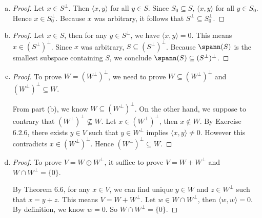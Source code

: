 \begin{Exercise}
	\begin{enumerate}[(a)]
		\item
		\begin{proof}
			Let $x\in S^{\perp}$. Then $\langle x,y \rangle$ for all $y\in S$. Since $S_0 \subseteq S$, $\langle x,y \rangle$ for all $y\in S_0$. Hence $x\in S_0^{\perp}$. Because $x$ was arbitrary, it follows that $S^{\perp}\subseteq S_0^{\perp}$.
		\end{proof}
		
		\item
		\begin{proof}
			Let $x\in S$, then for any $y\in S^{\perp}$, we have $\langle x,y \rangle = 0$. This means $x\in (S^{\perp})^{\perp}$. Since $x$ was arbitrary, $S\subseteq (S^{\perp})^{\perp}$. Because $\spann(S)$ is the smallest subspace containing $S$, we conclude $\spann(S)\subseteq (S^{\perp})^{\perp}$.
		\end{proof}
		
		\item
		\begin{proof}
			To prove $W = (W^{\perp})^{\perp}$, we need to prove $W \subseteq (W^{\perp})^{\perp}$ and $(W^{\perp})^{\perp} \subseteq W$.
			
			From part (b), we know $W \subseteq (W^{\perp})^{\perp}$. On the other hand, we suppose to contrary that  $(W^{\perp})^{\perp} \nsubseteq W$. Let $x\in (W^{\perp})^{\perp}$, then $x\notin W$. By Exercise 6.2.6, there exists $y\in V$ such that $y\in W^{\perp}$ implies $\langle x,y \rangle \neq 0$. However this contradicts $x\in (W^{\perp})^{\perp}$. Hence $(W^{\perp})^{\perp} \subseteq W$.
		\end{proof}
		
		\item
		\begin{proof}
			To prove $V = W \oplus W^{\perp}$, it suffice to prove $V = W + W^{\perp}$ and $W\cap W^{\perp} = \{0\}$.
			
			By Theorem 6.6, for any $x\in V$, we can find unique $y\in W$ and $z\in W^{\perp}$ such that $x = y+z$. This means $V = W + W^{\perp}$. Let $w\in W\cap W^{\perp}$, then $\langle w, w \rangle=0$. By definition, we know $w = 0$. So $W\cap W^{\perp} = \{0\}$.
		\end{proof}
		
	\end{enumerate}
\end{Exercise}
